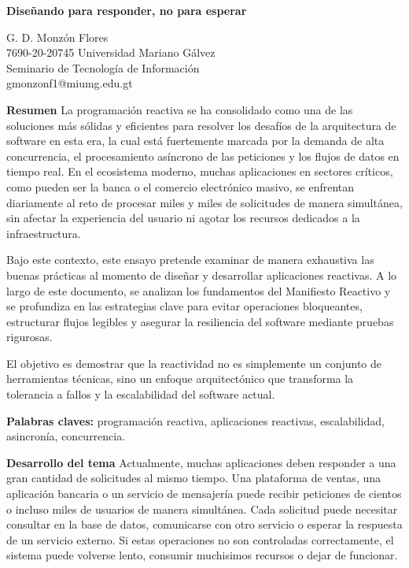 \documentclass[12pt,letterpaper]{article}
\begin{document}
\begin{center}
    {\large\textbf{Diseñando para responder, no para esperar}}

    \vspace{0.3cm}
    G. D. Monzón Flores\\
    7690-20-20745 Universidad Mariano Gálvez\\[0.15cm]

    Seminario de Tecnología de Información\\
    gmonzonf1@miumg.edu.gt
\end{center}

\textbf{Resumen}
La programación reactiva se ha consolidado como una de las soluciones más sólidas y eficientes para resolver los desafíos de la arquitectura de software en esta era, la cual está fuertemente marcada por la demanda de alta concurrencia, el procesamiento asíncrono de las peticiones y los flujos de datos en tiempo real. En el ecosistema moderno, muchas aplicaciones en sectores críticos, como pueden ser la banca o el comercio electrónico masivo, se enfrentan diariamente al reto de procesar miles y miles de solicitudes de manera simultánea, sin afectar la experiencia del usuario ni agotar los recursos dedicados a la infraestructura.

Bajo este contexto, este ensayo pretende examinar de manera exhaustiva las buenas prácticas al momento de diseñar y desarrollar aplicaciones reactivas. A lo largo de este documento, se analizan los fundamentos del Manifiesto Reactivo y se profundiza en las estrategias clave para evitar operaciones bloqueantes, estructurar flujos legibles y asegurar la resiliencia del software mediante pruebas rigurosas.

El objetivo es demostrar que la reactividad no es simplemente un conjunto de herramientas técnicas, sino un enfoque arquitectónico que transforma la tolerancia a fallos y la escalabilidad del software actual.

\textbf{Palabras claves:} programación reactiva, aplicaciones reactivas, escalabilidad, asincronía, concurrencia.

\textbf{Desarrollo del tema}
Actualmente, muchas aplicaciones deben responder a una gran cantidad de solicitudes al mismo tiempo. Una plataforma de ventas, una aplicación bancaria o un servicio de mensajería puede recibir peticiones de cientos o incluso miles de usuarios de manera simultánea. Cada solicitud puede necesitar consultar en la base de datos, comunicarse con otro servicio o esperar la respuesta de un servicio externo. Si estas operaciones no son controladas correctamente, el sistema puede volverse lento, consumir muchisimos recursos o dejar de funcionar.
\end{document}
